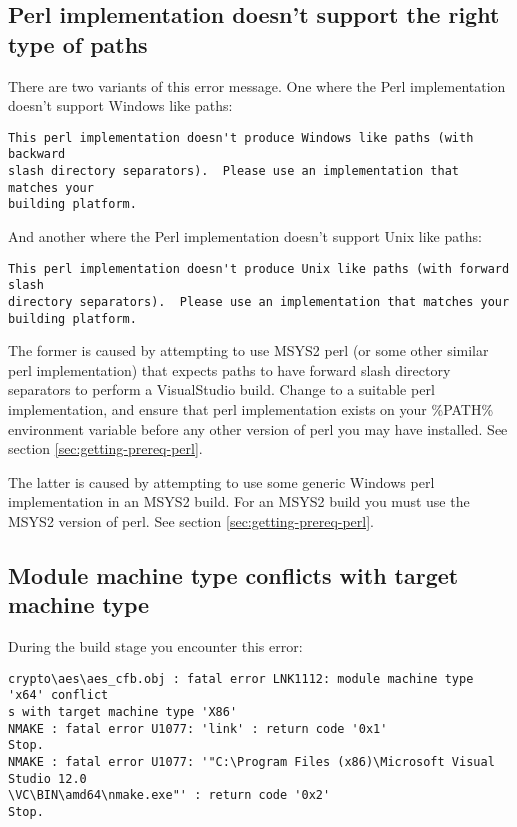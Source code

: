\subsection{Perl implementation doesn't support the right type of paths}

There are two variants of this error message. One where the Perl implementation
doesn't support Windows like paths:

\begin{verbatim}
This perl implementation doesn't produce Windows like paths (with backward
slash directory separators).  Please use an implementation that matches your
building platform.
\end{verbatim}

And another where the Perl implementation doesn't support Unix like paths:

\begin{verbatim}
This perl implementation doesn't produce Unix like paths (with forward slash
directory separators).  Please use an implementation that matches your
building platform.
\end{verbatim}

The former is caused by attempting to use MSYS2 perl (or some other similar perl
implementation) that expects paths to have forward slash directory separators to
perform a VisualStudio build. Change to a suitable perl implementation, and
ensure that perl implementation exists on your \%PATH\% environment variable
before any other version of perl you may have installed. See section
\ref{sec:getting-prereq-perl}.

The latter is caused by attempting to use some generic Windows perl
implementation in an MSYS2 build. For an MSYS2 build you must use the MSYS2
version of perl. See section \ref{sec:getting-prereq-perl}.

\subsection{Module machine type conflicts with target machine type}

During the build stage you encounter this error:

\begin{verbatim}
crypto\aes\aes_cfb.obj : fatal error LNK1112: module machine type 'x64' conflict
s with target machine type 'X86'
NMAKE : fatal error U1077: 'link' : return code '0x1'
Stop.
NMAKE : fatal error U1077: '"C:\Program Files (x86)\Microsoft Visual Studio 12.0
\VC\BIN\amd64\nmake.exe"' : return code '0x2'
Stop.
\end{verbatim}


